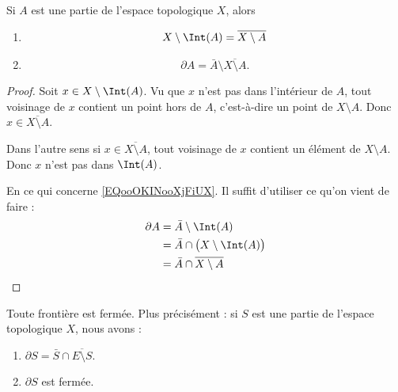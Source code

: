 \begin{proposition}	\label{PROPooGXYCooRcnHDD}
	Si \( A\) est une partie de l'espace topologique \( X\), alors
	\begin{enumerate}
		\item
		      \begin{equation}
			      X\setminus \Int(A)=\overline{X\setminus A}
		      \end{equation}
		\item
		      \begin{equation}		\label{EQooOKINooXjFiUX}
			      \partial A=\bar A\setminus\overline{X\setminus A}.
		      \end{equation}
	\end{enumerate}
\end{proposition}

\begin{proof}
	Soit \( x\in X\setminus\Int(A)\). Vu que \( x\) n'est pas dans l'intérieur de \( A\), tout voisinage de \( x\) contient un point hors de \( A\), c'est-à-dire un point de \( X\setminus A\). Donc \( x\in\overline{X\setminus A}\).

	Dans l'autre sens si \( x\in\overline{X\setminus A}\), tout voisinage de \( x\) contient un élément de \( X\setminus A\). Donc \( x\) n'est pas dans \( \Int(A)\).

	En ce qui concerne \eqref{EQooOKINooXjFiUX}. Il suffit d'utiliser ce qu'on vient de faire :
	\begin{subequations}
		\begin{align}
			\partial A & =\bar A\setminus \Int(A)                  \\
			           & =\bar A\cap\big( X\setminus \Int(A) \big) \\
			           & =\bar A\cap\overline{X\setminus A}
		\end{align}
	\end{subequations}
\end{proof}

\begin{proposition}	\label{PROPooTHOPooCOGmZD}
	Toute frontière est fermée. Plus précisément : si \( S\) est une partie de l'espace topologique \( X\), nous avons :
	\begin{enumerate}
		\item		\label{ITEMooCIGTooOyNTYt}
		      \( \partial S=\bar S\cap \overline{E\setminus S}\).
		\item		\label{ITEMooCSHKooHibSre}
		      \( \partial S\) est fermée.
	\end{enumerate}
\end{proposition}


